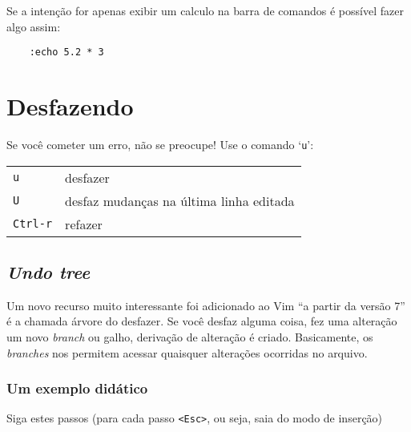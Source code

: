 {\Large {}} Se a intenção for apenas exibir um calculo na barra de comandos
é possível fazer algo assim:

\begin{verbatim}
    :echo 5.2 * 3
\end{verbatim}

\section{Desfazendo}
\label{Desfazendo}

Se você cometer um erro, não se preocupe! Use o comando `{\tt u}':

\begin{table}[htb]\begin{center} \begin{tabular}{ll} \hline
     \verb|u| & desfazer\\
     \verb|U| & desfaz mudanças na última linha editada\\
     \verb|Ctrl-r| & refazer\\
\hline \end{tabular}\end{center}\end{table}

\subsection{{\em Undo tree}}
\label{Undo tree}

Um novo recurso muito interessante foi adicionado ao Vim ``a partir da
versão 7''  é a chamada árvore do desfazer.  Se
você desfaz alguma coisa, fez uma alteração um novo {\em branch} ou
galho, derivação de alteração é criado.  Basicamente, os {\em branches}
nos permitem acessar quaisquer alterações ocorridas no arquivo.

\subsubsection{Um exemplo didático}
\label{Um exemplo didático}

Siga estes passos (para cada passo \verb|<Esc>|, ou seja, saia do modo
de inserção)

